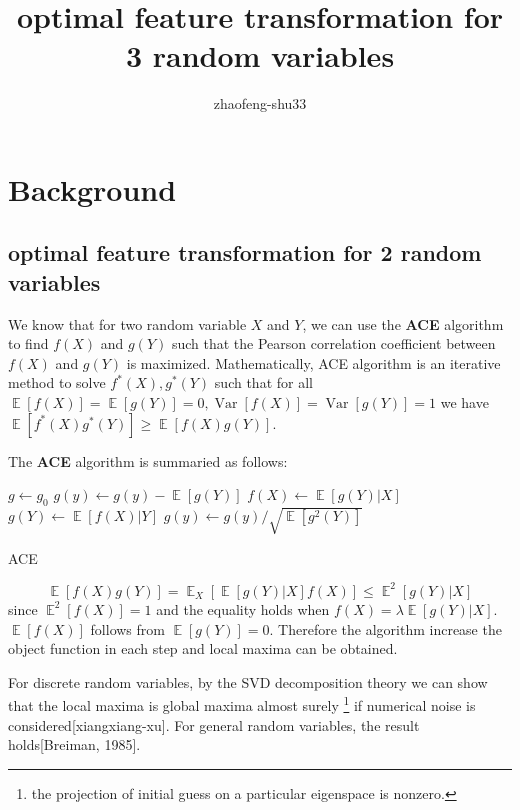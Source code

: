 \documentclass{article}
\DeclareMathOperator\E{\mathbb{E}}
\DeclareMathOperator\Var{\mathrm{Var}}
\begin{document}
\title{optimal feature transformation for 3 random variables}
\author{zhaofeng-shu33}
\maketitle
\section{Background}
\subsection{optimal feature transformation for 2 random variables}
We know that for two random variable $X$ and $Y$,  we can use the \textbf{ACE} algorithm to find $f(X)$ and $g(Y)$ such that
the Pearson correlation coefficient between $f(X)$ and $g(Y)$ is maximized.
Mathematically, ACE algorithm is an iterative method to solve $f^*(X), g^*(Y)$ such that 
for all $\E[f(X)]=\E[g(Y)]=0, \Var[f(X)]=\Var[g(Y)]=1$ we have $\E[f^*(X)g^*(Y)]\geq \E[f(X)g(Y)]$.

The \textbf{ACE} algorithm is summaried as follows:

\begin{algorithm}
\begin{algorithmic}
\STATE $g \leftarrow g_0$ 
\STATE $ g(y) \leftarrow g(y) - \E[g(Y)]$ 
\REPEAT
\STATE $f(X) \leftarrow \E[g(Y) | X]$
\STATE $g(Y) \leftarrow \E[f(X) | Y]$
\STATE $ g(y) \leftarrow g(y)/\sqrt{\E[g^2(Y)]}$
\UNTIL{ $\E[f(X)g(Y)]$ stops to increase\footnotemark}
\end{algorithmic}
\caption{ACE}\label{ACE}
\end{algorithm}
\begin{equation}\label{eq:XY}
\E[f(X)g(Y)]=\E_{X} [ \E[g(Y)|X] f(X)] \leq \E^2[g(Y)|X]
\end{equation}
since $\E^2[f(X)]=1$ and the equality holds when $f(X) = \lambda \E[g(Y)|X]$.
$\E[f(X)]$ follows from $\E[g(Y)]=0$.
Therefore the algorithm increase the object function in each step and local maxima can be obtained.

For discrete random variables, by the SVD decomposition theory we can show that the local maxima is global maxima almost surely
\footnote{the projection of initial guess on a particular eigenspace is nonzero.} if numerical noise is considered[xiangxiang-xu]. For general random variables, the result holds[Breiman, 1985].
\end{document}
